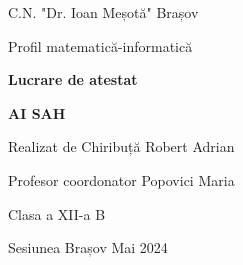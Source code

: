 \begin{titlepage}
	\begin{center}
		C.N. "Dr. Ioan Meșotă" Brașov

		Profil matematică-informatică

		\vspace*{\fill}
		\Huge
		\textbf{Lucrare de atestat}

		\vspace{0.5cm}

		\textbf{AI SAH}
		\vspace*{\fill}
	\end{center}

	Realizat de Chiribuță Robert Adrian

	Profesor coordonator Popovici Maria

	Clasa a XII-a B

	\vspace{1cm}

	\begin{center}
		Sesiunea Brașov Mai 2024
	\end{center}
\end{titlepage}
